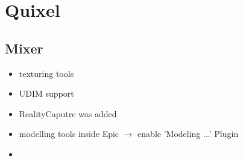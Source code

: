 \chapter{Quixel}
    \section{Mixer}
        \begin{itemize}
            \item texturing tools
            \item UDIM support
            \item RealityCaputre was added
            \item modelling tools inside Epic $\rightarrow$ enable 'Modeling ...' Plugin
            \item 
        \end{itemize}